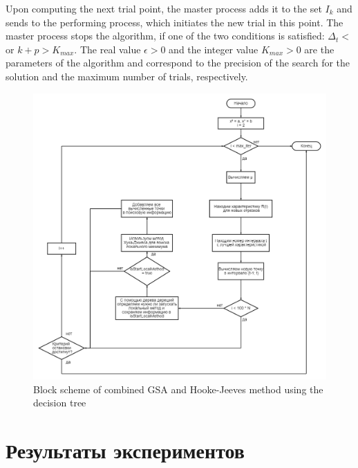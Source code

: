 \documentclass{svproc}
\begin{document}
Upon computing the next trial point, the master process adds it to the set $I_k$ and sends to the  performing process, which initiates the new trial in this point. The master process stops the algorithm, if one of the two conditions is satisfied: $\Delta_t<$ or  $k+p>K_{max}$. The real value $\epsilon>0$ and the integer value $K_{max}>0$ are the parameters of the algorithm  and correspond to the precision of the search for the solution and the maximum number of trials,  respectively.

\begin{figure}[ht!]
	
	\begin{center} 
				\begin{minipage}[h]{0.9\linewidth} 			\includegraphics[width=1\linewidth]{figure/fig3.png}
					 			\caption{Block scheme of combined GSA and Hooke-Jeeves method using the  decision tree} %
				 \end{minipage}
	\end{center}
\end{figure}





\section{Результаты экспериментов}\label{SecR}
\end{document}
